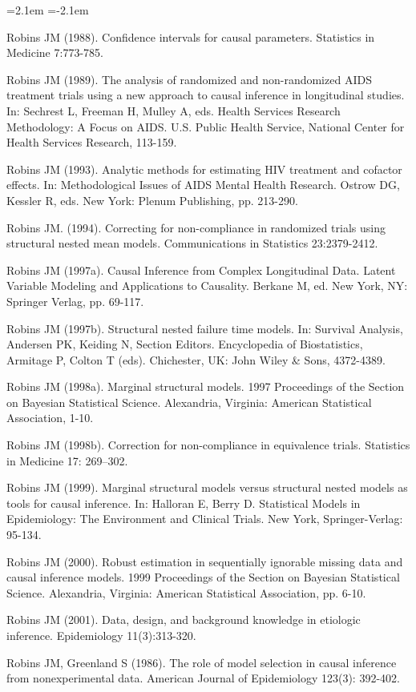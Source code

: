 \begin{list}{}{\leftmargin=2.1em   \itemindent=-2.1em \parsep=0pt \itemsep=1.6pt \topsep=4pt \rightmargin=0pt}
\item Robins JM (1988). Confidence intervals for causal parameters. Statistics in Medicine 7:773-785.
\item Robins JM (1989). The analysis of randomized and non-randomized AIDS treatment trials using a new approach to causal inference in longitudinal studies. In: Sechrest L, Freeman H, Mulley A, eds. Health Services Research Methodology: A Focus on AIDS. U.S. Public Health Service, National Center for Health Services Research, 113-159.
\item Robins JM (1993). Analytic methods for estimating HIV treatment and cofactor effects. In: Methodological Issues of AIDS Mental Health Research. Ostrow DG, Kessler R, eds. New York: Plenum Publishing, pp. 213-290.
\item Robins JM. (1994). Correcting for non-compliance in randomized trials using structural nested mean models. Communications in Statistics 23:2379-2412.
\item Robins JM (1997a). Causal Inference from Complex Longitudinal Data. Latent Variable Modeling and Applications to Causality. Berkane M, ed. New York, NY: Springer Verlag, pp. 69-117.
\item Robins JM (1997b). Structural nested failure time models. In: Survival Analysis, Andersen PK, Keiding N, Section Editors. Encyclopedia of Biostatistics, Armitage P, Colton T (eds). Chichester, UK: John Wiley \& Sons, 4372-4389.
\item Robins JM (1998a). Marginal structural models. 1997 Proceedings of the Section on Bayesian Statistical Science. Alexandria, Virginia: American Statistical Association, 1-10.
\item Robins JM (1998b). Correction for non-compliance in equivalence trials. Statistics in Medicine 17: 269–302.
\item Robins JM (1999). Marginal structural models versus structural nested models as tools for causal inference. In: Halloran E, Berry D. Statistical Models in Epidemiology: The Environment and Clinical Trials. New York, Springer-Verlag: 95-134.
\item Robins JM (2000). Robust estimation in sequentially ignorable missing data and causal inference models. 1999 Proceedings of the Section on Bayesian Statistical Science. Alexandria, Virginia: American Statistical Association, pp. 6-10.
\item Robins JM (2001). Data, design, and background knowledge in etiologic inference. Epidemiology 11(3):313-320.
\item Robins JM, Greenland S (1986). The role of model selection in causal inference from nonexperimental data. American Journal of Epidemiology 123(3): 392-402.

\end{list}
